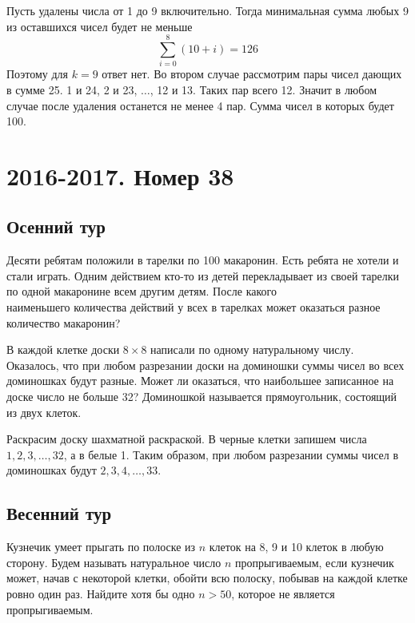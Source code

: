 \documentclass[11pt, a4paper]{common/document_template}
\begin{document}
\begin{Solution}
Пусть удалены числа от 1 до 9 включительно. Тогда минимальная сумма любых 9 из оставшихся чисел будет не меньше 
$$
\sum_{i = 0}^{8} (10 + i) = 126
$$
Поэтому для $k = 9$ ответ нет. Во втором случае рассмотрим пары чисел дающих в сумме 25. 1 и 24, 2 и 23, $\dots$, 12 и 13. Таких пар всего 12. Значит в любом случае после удаления останется не менее 4 пар. Сумма чисел в которых будет 100.
\end{Solution}

\chapter{2016-2017. Номер 38}

\section{Осенний тур}

\begin{exercise}
Десяти ребятам положили в тарелки по 100 макаронин. Есть ребята не хотели и стали играть. Одним действием кто-то из детей перекладывает из своей тарелки по одной макаронине всем другим детям. После какого \\ наименьшего количества действий у всех в тарелках может оказаться разное количество макаронин?
\end{exercise}

\begin{exercise}
В каждой клетке доски $8 \times 8$ написали по одному натуральному числу. Оказалось, что при любом разрезании доски на доминошки суммы чисел во всех доминошках будут разные. Может ли оказаться, что наибольшее записанное на доске число не больше 32? Доминошкой называется прямоугольник, состоящий из двух клеток.
\end{exercise}

\begin{Solution}
Раскрасим доску шахматной раскраской. В черные клетки запишем числа $1, 2, 3, \dots, 32$, а в белые 1. Таким образом, при любом разрезании суммы чисел в доминошках будут $2, 3, 4, \dots, 33$.
\end{Solution}

\section{Весенний тур}

\begin{exercise}
Кузнечик умеет прыгать по полоске из $n$ клеток на 8, 9 и 10 клеток в любую сторону. Будем называть натуральное число $n$ пропрыгиваемым, если кузнечик может, начав с некоторой клетки, обойти всю полоску, побывав на каждой клетке ровно один раз. Найдите хотя бы одно $n > 50$, которое не является пропрыгиваемым.
\end{exercise}
\end{document}
